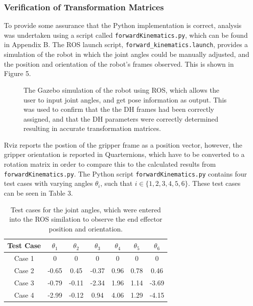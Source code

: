 \documentclass[a4paper]{article}
\begin{document}
\subsubsection{Verification of Transformation Matrices}
To provide some assurance that the Python implementation is correct, analysis was undertaken using a script called \verb|forwardKinematics.py|, which can be found in Appendix B. The ROS launch script, \verb|forward_kinematics.launch|, provides a simulation of the robot in which the joint angles could be manually adjusted, and the position and orientation of the robot's frames observed. This is shown in Figure 5.

\begin{figure}[h]
	\centering
	\caption{The Gazebo simulation of the robot using ROS, which allows the user to input joint angles, and get pose information as output. This was used to confirm that the the DH frames had been correctly assigned, and that the DH parameters were correctly determined resulting in accurate transformation matrices.}
\end{figure}

Rviz reports the postion of the gripper frame as a position vector, however, the gripper orientation is reported in Quarternions, which have to be converted to a rotation matrix in order to compare this to the calculated results from \verb|forwardKinematics.py|. The Python script \verb|forwardKinematics.py| contains four test cases with varying angles $\theta_i$, such that $i \in \{1,2,3,4,5,6\}$. These test cases can be seen in Table 3.

\begin{table}[h]
	\centering
	\caption{Test cases for the joint angles, which were entered into the ROS similation to observe the end effector position and orientation.}
	\begin{tabular}{ccccccc}
		\toprule
		\textbf{Test Case} & $\theta_1$ & $\theta_2$ & $\theta_3$ & $\theta_4$ & $\theta_5$ & $\theta_6$\\
		\midrule
		Case 1 & 0 & 0 & 0 & 0 & 0 & 0\\
		Case 2 & -0.65 & 0.45 & -0.37 & 0.96 & 0.78 & 0.46\\
		Case 3 & -0.79 & -0.11 & -2.34 & 1.96 & 1.14 & -3.69\\
		Case 4 & -2.99 & -0.12 & 0.94 & 4.06 & 1.29 & -4.15\\
		\bottomrule
	\end{tabular}
\end{table}
\end{document}
